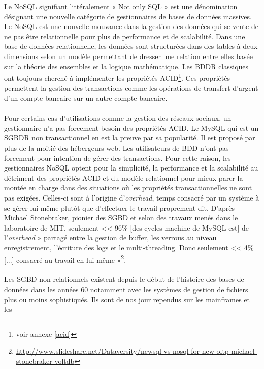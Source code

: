 Le \textsf{NoSQL} signifiant littéralement « \textsf{Not only SQL} »
est une dénomination désignant une nouvelle catégorie de gestionnaires
de bases de données massives. Le \textsf{NoSQL} est une nouvelle
mouvance dans la gestion des données qui se vente de ne pas être
relationnelle pour plus de performance et de scalabilité. Dans une
base de données relationnelle, les données sont structurées dans des
tables à deux dimensions selon un modèle permettant de dresser une
relation entre elles basée sur la théorie des ensembles et la logique
mathématique. Les \textsf{BDDR} classiques ont toujours cherché à
implémenter les propriétés \textsf{ACID}\footnote{voir annexe
  \ref{acid}}. Ces propriétés permettent la gestion des
transactions comme les opérations de transfert d'argent d'un compte
bancaire sur un autre compte bancaire.  
\\ \\ 
Pour certains cas
d'utilisations comme la gestion des réseaux sociaux, un gestionnaire
n'a pas forcement besoin des propriétés \textsf{ACID}. Le
\textsf{MySQL} qui est un \textsf{SGBDR} non transactionnel en est la
preuve par sa popularité. Il est proposé par plus de la moitié des
hébergeurs \textsf{web}. Les utilisateurs de \textsf{BDD} n'ont pas
forcement pour intention de gérer des transactions. Pour cette raison,
les gestionnaires \textsf{NoSQL} optent pour la simplicité, la
performance et la scalabilité au détriment des propriétés
\textsf{ACID} et du modèle relationnel pour mieux parer la montée en
charge dans des situations où les propriétés transactionnelles ne sont
pas exigées. Celles-ci sont à l'origine d'\textit{overhead}, temps consacré par un système à se gérer lui-même plutôt que d'effectuer le travail proprement dit. D'après \textsf{Michael Stonebraker}, pionier des \textsf{SGBD} et selon des travaux menés dans le laboratoire de \textsf{MIT}, seulement << 96\% [des cycles machine de \textsf{MySQL} est] de l’\textit{overhead} » partagé entre la gestion de \textsf{buffer}, les verrous au niveau enregistrement, l’écriture des \textsf{logs} et le \textsf{multi-threading}. Donc seulement << 4\% [...] consacré au travail en lui-même »\footnote{\url{http://www.slideshare.net/Dataversity/newsql-vs-nosql-for-new-oltp-michael-stonebraker-voltdb}}.  
\\ \\ 
Les \textsf{SGBD} non-relationnels existent depuis
le début de l'histoire des bases de données dans les années $60$
notamment avec les systèmes de gestion de fichiers plus ou moins
sophistiqués. Ils sont de nos jour rependus sur les mainframes et les

